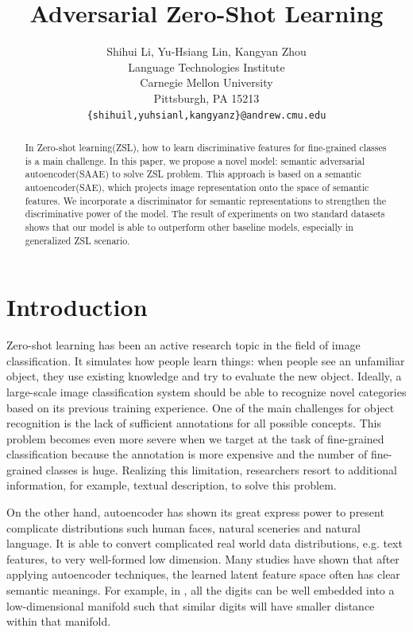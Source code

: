 \documentclass{article}
\title{Adversarial Zero-Shot Learning}
\author{
	Shihui Li, Yu-Hsiang Lin, Kangyan Zhou
		\\
	Language Technologies Institute\\
	Carnegie Mellon University\\
	Pittsburgh, PA 15213 \\
	\texttt{\{shihuil,yuhsianl,kangyanz\}@andrew.cmu.edu} \\
}
\begin{document}
\maketitle

\begin{abstract}
In Zero-shot learning(ZSL), how to learn discriminative features for fine-grained classes is a main challenge. In this paper, we propose a novel model: semantic adversarial autoencoder(SAAE) to solve ZSL problem. This approach is based on a semantic autoencoder(SAE), which projects image representation onto the space of semantic features. We incorporate a discriminator for semantic representations to  strengthen the discriminative power of the model. The result of experiments on two standard datasets shows that our model is able to outperform other baseline models, especially in generalized ZSL scenario. 
\end{abstract}


\section{Introduction}

Zero-shot learning has been an active research topic in the field of image classification. It simulates how people learn things: when people see an unfamiliar object, they use existing knowledge and try to evaluate the new object. Ideally, a large-scale image classification system should be able to recognize novel categories based on its previous training experience. One of the main challenges for object recognition is the lack of sufficient annotations for all possible concepts. This problem becomes even more severe when we target at the task of fine-grained classification because the annotation is more expensive and the number of fine-grained classes is huge. Realizing this limitation, researchers resort to additional information, for example, textual description, to solve this problem.  

On the other hand, autoencoder has shown its great express power to present complicate distributions such human faces, natural sceneries and natural language. It is able to convert complicated real world data distributions, e.g. text features, to very well-formed low dimension. Many studies have shown that after applying autoencoder techniques, the learned latent feature space often has clear semantic meanings. For example, in \cite{makhzani2015adversarial}, all the digits can be well embedded into a low-dimensional manifold such that similar digits will have smaller distance within that manifold.
\end{document}

